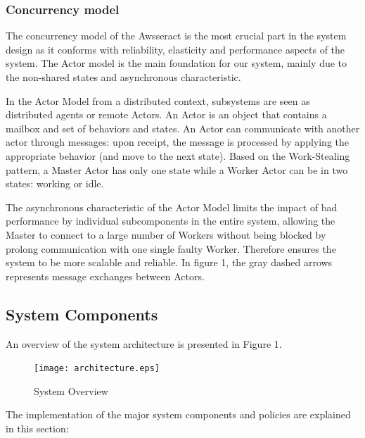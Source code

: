 \documentclass[conference]{IEEEtran}
\begin{document}
\subsubsection{Concurrency model}\label{sec:sysdesign_conc}

The concurrency model of the Awsseract is the most crucial part in the system design as it conforms with reliability, elasticity and performance aspects of the system. The Actor model \cite{agha} is the main foundation for our system, mainly due to the non-shared states and asynchronous characteristic. 

In the Actor Model from a distributed context, subsystems are seen as distributed agents or remote Actors. An Actor is an object that contains a mailbox and set of behaviors and states. An Actor can communicate with another actor through messages: upon receipt, the message is processed by applying the appropriate behavior (and move to the next state). Based on the Work-Stealing pattern, a Master Actor has only one state while a Worker Actor can be in two states: working or idle. 

The asynchronous characteristic of the Actor Model limits the impact of bad performance by individual subcomponents in the entire system, allowing the Master to connect to a large number of Workers without being blocked by prolong communication with one single faulty Worker. Therefore ensures the system to be more scalable and reliable. In figure 1, the gray dashed arrows represents message exchanges between Actors.

\subsection{System Components}\label{sec:sysdesign_comp}

An overview of the system architecture is presented in Figure 1. 

\begin{figure}[H]
\centering
        \texttt{[image: architecture.eps]}
    \caption{System Overview}
    \label{fig:sysoverview}
\end{figure}




The implementation of the major system components and policies are explained in this section: \\


\end{document}
